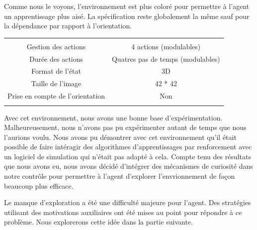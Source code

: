 Comme nous le voyons, l'environnement est plus coloré pour permettre à l'agent un apprentissage plus aisé. La spécification reste globalement la même sauf pour la dépendance par rapport à l'orientation. 

\begin{center}
    \begin{tabular}{|c|c|}
    \Xhline{2\arrayrulewidth}
    \multicolumn{2}{|c|}{Spécifications} \\
    \Xhline{2\arrayrulewidth}
    Gestion des actions &  4 actions (modulables) \footnotemark\\
    Durée des actions & Quatres pas de temps (modulables) \\
    Format de l'état&3D\\
    Taille de l'image & 42 * 42\\
    Prise en compte de l'orientation& Non \\
    \Xhline{2\arrayrulewidth}
\end{tabular}
\end{center}

Avec cet environnement, nous avons une bonne base d'expérimentation. Malheureusement, nous n'avons pas pu expérimenter autant de temps que nous l'aurions voulu. Nous avons pu démontrer avec cet environnement qu'il était possible de faire intéragir des algorithmes d'apprentissages par renforcement avec un logiciel de simulation qui n'était pas adapté à cela. Compte tenu des résultats que nous avons eu, nous avons décidé d'intégrer des mécanismes de curiosité dans notre contrôle pour permettre à l'agent d'explorer l'envrionnement de façon beaucoup plus efficace. 

Le manque d'exploration a été une difficulté majeure pour l'agent. Des stratégies utilisant des motivations auxiliaires ont été mises au point pour répondre à ce problème. Nous explorerons cette idée dans la partie suivante.


